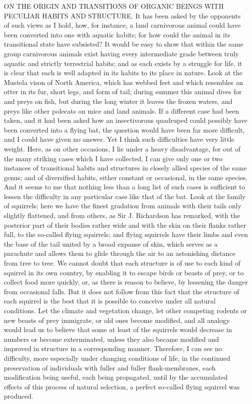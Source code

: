ON THE ORIGIN AND TRANSITIONS OF ORGANIC BEINGS WITH PECULIAR HABITS AND STRUCTURE.
It has been asked by the opponents of such views as I hold, how, for instance, a land carnivorous animal could have been converted into one with aquatic habits; for how could the animal in its transitional state have subsisted? It would be easy to show that within the same group carnivorous animals exist having every intermediate grade between truly aquatic and strictly terrestrial habits; and as each exists by a struggle for life, it is clear that each is well adapted in its habits to its place in nature. Look at the Mustela vison of North America, which has webbed feet and which resembles an otter in its fur, short legs, and form of tail; during summer this animal dives for and preys on fish, but during the long winter it leaves the frozen waters, and preys like other polecats on mice and land animals. If a different case had been taken, and it had been asked how an insectivorous quadruped could possibly have been converted into a flying bat, the question would have been far more difficult, and I could have given no answer. Yet I think such difficulties have very little weight.
Here, as on other occasions, I lie under a heavy disadvantage, for out of the many striking cases which I have collected, I can give only one or two instances of transitional habits and structures in closely allied species of the same genus; and of diversified habits, either constant or occasional, in the same species. And it seems to me that nothing less than a long list of such cases is sufficient to lessen the difficulty in any particular case like that of the bat.
Look at the family of squirrels; here we have the finest gradation from animals with their tails only slightly flattened, and from others, as Sir J. Richardson has remarked, with the posterior part of their bodies rather wide and with the skin on their flanks rather full, to the so-called flying squirrels; and flying squirrels have their limbs and even the base of the tail united by a broad expanse of skin, which serves as a parachute and allows them to glide through the air to an astonishing distance from tree to tree. We cannot doubt that each structure is of use to each kind of squirrel in its own country, by enabling it to escape birds or beasts of prey, or to collect food more quickly, or, as there is reason to believe, by lessening the danger from occasional falls. But it does not follow from this fact that the structure of each squirrel is the best that it is possible to conceive under all natural conditions. Let the climate and vegetation change, let other competing rodents or new beasts of prey immigrate, or old ones become modified, and all analogy would lead us to believe that some at least of the squirrels would decrease in numbers or become exterminated, unless they also became modified and improved in structure in a corresponding manner. Therefore, I can see no difficulty, more especially under changing conditions of life, in the continued preservation of individuals with fuller and fuller flank-membranes, each modification being useful, each being propagated, until by the accumulated effects of this process of natural selection, a perfect so-called flying squirrel was produced.
